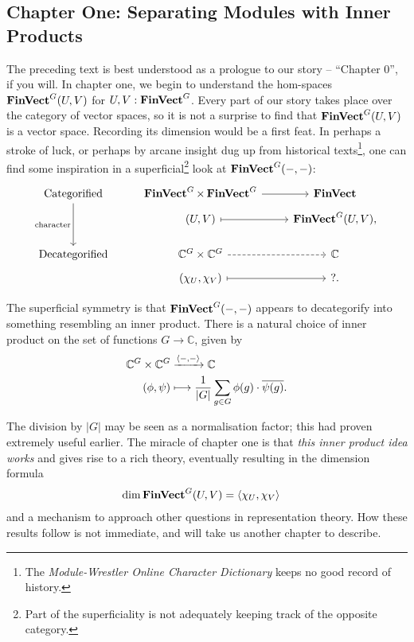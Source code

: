 \subsection{Chapter One: Separating Modules with Inner Products} %
\par The preceding text is best understood as a prologue to our story -- ``Chapter $0$'', if you will. In chapter one, we begin to understand the hom-spaces $\operatorname{\mathbf{FinVect}}^G (U, V)$ for $U, V : \operatorname{\mathbf{FinVect}}^G$. Every part of our story takes place over the category of vector spaces, so it is not a surprise to find that $\operatorname{\mathbf{FinVect}}^G (U, V)$ is a vector space. Recording its dimension would be a first feat. In perhaps a stroke of luck, or perhaps by arcane insight dug up from historical texts\footnote{The \textit{Module-Wrestler Online Character Dictionary} keeps no good record of history.}, one can find some inspiration in a superficial\footnote{Part of the superficiality is not adequately keeping track of the opposite category.} look at $\operatorname{\mathbf{FinVect}}^G({-}, {-})$:
\begin{align*}
  \begin{tikzcd}[ampersand replacement = \;, row sep = tiny]
    \text{Categorified} \arrow[dddd, "\text{character}"']
      \; \FinVect^G \times \FinVect^G
        \arrow[r]
      \; \FinVect
    \\
      \; (U, V)
        \arrow[r, mapsto]
      \; \FinVect^G (U, V)
      ,
    \\
    \\
    \\
    \text{Decategorified}
      \; \mathbb{C}^G \times \mathbb{C}^G
        \arrow[r, dashed]
      \; \mathbb{C}
    \\
      \; (\chi_U, \chi_V)
        \arrow[r, mapsto]
      \; {?}
      .
  \end{tikzcd}
\end{align*}
\par The superficial symmetry is that $\operatorname{\mathbf{FinVect}}^G ({-}, {-})$ appears to decategorify into something resembling an inner product. There is a natural choice of inner product on the set of functions $G \to \mathbb{C}$, given by
\begin{align*}
  \mathbb{C}^G \times \mathbb{C}^G
  &\xrightarrow{\langle {-}, {-} \rangle}
  \mathbb{C}
  \\
  (\phi, \psi)
  &\longmapsto
  \frac{1}{\lvert G \rvert} \sum_{g \in G} \phi(g) \cdot \overline{\psi(g)}
  .
\end{align*}
\par The division by $\lvert G \rvert$ may be seen as a normalisation factor; this had proven extremely useful earlier. The miracle of chapter one is that \textit{this inner product idea works} and gives rise to a rich theory, eventually resulting in the dimension formula
\begin{align*}
  \dim \operatorname{\mathbf{FinVect}}^G (U, V)
  &= \langle \chi_U, \chi_V \rangle
\end{align*}
and a mechanism to approach other questions in representation theory. How these results follow is not immediate, and will take us another chapter to describe.

